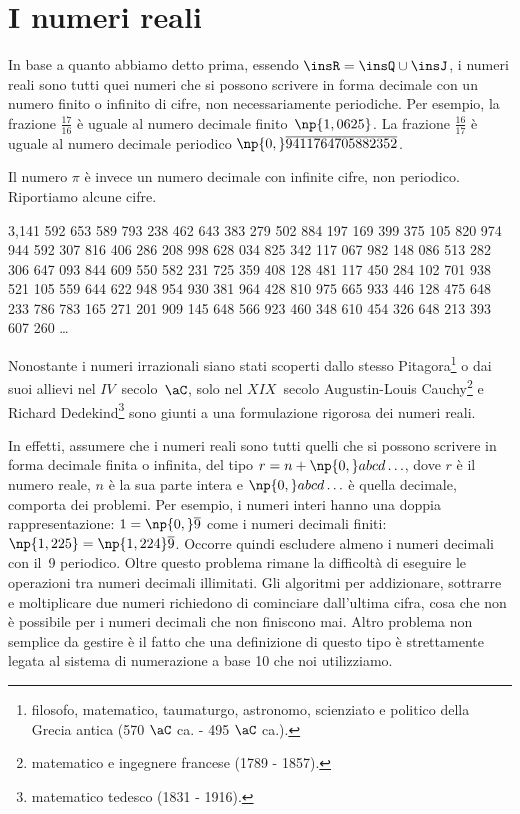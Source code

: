 \section{I numeri reali}

In base a quanto abbiamo detto prima, essendo $\insR=\insQ \cup \insJ$, i numeri reali sono tutti quei numeri che si possono scrivere in forma decimale con un numero finito o infinito di cifre, non necessariamente periodiche.
Per esempio, la frazione $\frac{17}{16}$ è uguale al numero decimale finito~$\np{1,0625}$.
La frazione $\frac{16}{17}$ è uguale al numero decimale periodico $\np{0,}\overline{9411764705882352}$.

Il numero $\pi$ è invece un numero decimale con infinite cifre, non periodico. Riportiamo alcune cifre. %

3,141 592 653 589 793 238 462 643 383 279 502 884 197 169 399 375 105 820 974 944 592 307 816 406 286
208 998 628 034 825 342 117 067 982 148 086 513 282 306 647 093 844 609 550 582 231 725 359 408 128 481 117 450 284 102
701 938 521 105 559 644 622 948 954 930 381 964 428 810 975 665 933 446 128 475 648 233 786 783 165 271 201 909 145 648
566 923 460 348 610 454 326 648 213 393 607 260 \ldots

Nonostante i numeri irrazionali siano stati scoperti dallo stesso Pitagora\footnote{filosofo, matematico, taumaturgo, astronomo, scienziato e politico della Grecia antica (570 $\aC$ ca. - 495 $\aC$ ca.).} o dai suoi allievi nel $IV$~secolo~$\aC$, solo nel $XIX$~secolo Augustin-Louis Cauchy\footnote{matematico e ingegnere francese (1789 - 1857).} e Richard Dedekind\footnote{matematico tedesco (1831 - 1916).} sono giunti a una formulazione rigorosa dei numeri reali.

In effetti, assumere che i numeri reali sono tutti quelli che si possono scrivere in forma decimale finita o infinita, del tipo $r=n+\np{0,}abcd\ldots$, dove $r$ è il numero reale, $n$ è la sua parte intera e $\np{0,}abcd\ldots$ è quella decimale, comporta dei problemi. Per esempio, i numeri interi hanno una doppia rappresentazione: $1=\np{0,}\overline{9}$ come i numeri decimali finiti: $\np{1,225}=\np{1,224}\overline{9}$. Occorre quindi escludere almeno i numeri decimali con il~9 periodico. Oltre questo problema rimane la difficoltà di eseguire le operazioni tra numeri decimali illimitati. Gli algoritmi per addizionare, sottrarre e moltiplicare due numeri richiedono di cominciare dall'ultima cifra, cosa che non è possibile per i numeri decimali che non finiscono mai. Altro problema non semplice da gestire è il fatto che una definizione di
questo tipo è strettamente legata al sistema di numerazione a base 10 che noi utilizziamo.

